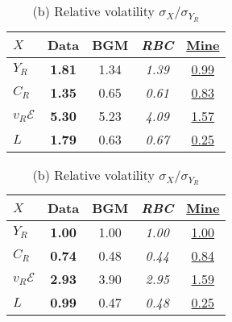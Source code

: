 \documentclass[a4paper,12pt]{article} %
\numberwithin{equation}{section} %
\numberwithin{figure}{section}
\numberwithin{table}{section}
\newcommand{\dat}{\textbf}      %
\newcommand{\rbc}{\emph}        %
\newcommand{\mine}[1]{\underline{#1}}   %
\begin{document}
\begin{table}[H]
\centering
\begin{subtable}[t]{.48\textwidth}
  \centering
  \caption*{(a) Volatility $\sigma_X$}
  \begin{tabular}{lcccc}
  \toprule
   $X$ & \dat{Data} & BGM & \rbc{RBC} & \mine{Mine}\\
  \midrule
   $Y_R$      & \dat{1.81} & 1.34 & \rbc{1.39} & \mine{0.99}\\
   $C_R$      & \dat{1.35} & 0.65 & \rbc{0.61} & \mine{0.83}\\
   $v_R\mathcal{E}$   & \dat{5.30} & 5.23 & \rbc{4.09} & \mine{1.57}\\
   $L$        & \dat{1.79} & 0.63 & \rbc{0.67} & \mine{0.25}\\
  \bottomrule
  \end{tabular}
\end{subtable}
\hfill
\begin{subtable}[t]{.48\textwidth}
  \centering
  \caption*{(b) Relative volatility $\sigma_X/\sigma_{Y_R}$}
  \begin{tabular}{lcccc}
  \toprule
   $X$ & \dat{Data} & BGM & \rbc{RBC} & \mine{Mine}\\
  \midrule
   $Y_R$      & \dat{1.00} & 1.00 & \rbc{1.00} & \mine{1.00}\\
   $C_R$      & \dat{0.74} & 0.48 & \rbc{0.44} & \mine{0.84}\\
   $v_R\mathcal{E}$   & \dat{2.93} & 3.90 & \rbc{2.95} & \mine{1.59}\\
   $L$        & \dat{0.99} & 0.47 & \rbc{0.48} & \mine{0.25}\\
  \bottomrule
  \end{tabular}
\end{subtable}

\vspace{0.8em}   %


\end{table}
\end{document}
